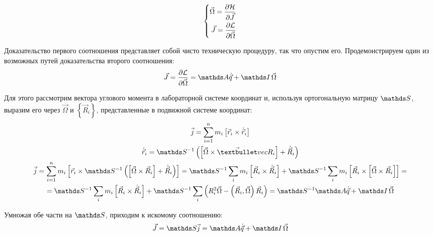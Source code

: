 \begin{gather}
\left\{
\begin{aligned}
\vec{\Omega} = \frac{\partial \mathcal{H}}{\partial \vec{J}} \\ 
\vec{J} = \frac{\partial \mathcal{L}}{\partial \vec{\Omega}}
\end{aligned}
\right. \notag
\end{gather}

Доказательство первого соотношения представляет собой чисто техническую процедуру, так что опустим его. Продемонстрируем один из возможных путей доказательства второго соотношения:
\vverh
\begin{gather}
\vec{J} = \frac{\partial \mathcal{L}}{\partial \vec{\Omega}} = \bbA \dot{\vec{q}} + \bbI \, \vec{\Omega} \notag
\end{gather}

Для этого рассмотрим вектора углового момента в лабораторной системе координат и, используя ортогональную матрицу $\bbS$, выразим его через $\vec{\Omega}$ и $\left\{ \vec{R}_i \right\}$, представленные в подвижной системе координат:
\vverh
\begin{gather}
\vec{j} = \sum_{i=1}^{n} m_i \left[ \vec{r}_i \times \dot{\vec{r}}_i \right] \notag \\
\dot{\vec{r}}_i = \bbS^{-1} \lb \left[ \vec{\Omega} \times \vec{•}vec{R}_i \right] + \dot{\vec{R}}_i \rb \notag \\
\vec{j} = \sum_{i=1}^{n} m_i \left[ \vec{r}_i \times \bbS^{-1} \lb \left[ \vec{\Omega} \times \vec{R}_i \right] + \dot{\vec{R}}_i \rb \right] =
\bbS^{-1} \sum_i m_i \left[ \vec{R}_i \times \dot{\vec{R}}_i \right] + \bbS^{-1} \sum_i m_i \left[ \vec{R}_i \times \left[ \vec{\Omega} \times \vec{R}_i \right] \right] = \notag \\
= \bbS^{-1} \sum_i m_i \left[ \vec{R}_i \times \dot{\vec{R}}_i \right] + \bbS^{-1} \sum_i \lb R_i^2 \vec{\Omega} - \lb \vec{R}_i , \vec{\Omega} \rb \vec{R}_i \rb = \bbS^{-1} \bbA \dot{\vec{q}} + \bbI \, \vec{\Omega} \notag
\end{gather}

Умножая обе части на $\bbS$, приходим к искомому соотношению: 
\begin{gather}
\vec{J} = \bbS \vec{j} = \bbA \dot{\vec{q}} + \bbI \, \vec{\Omega} \notag 
\end{gather}